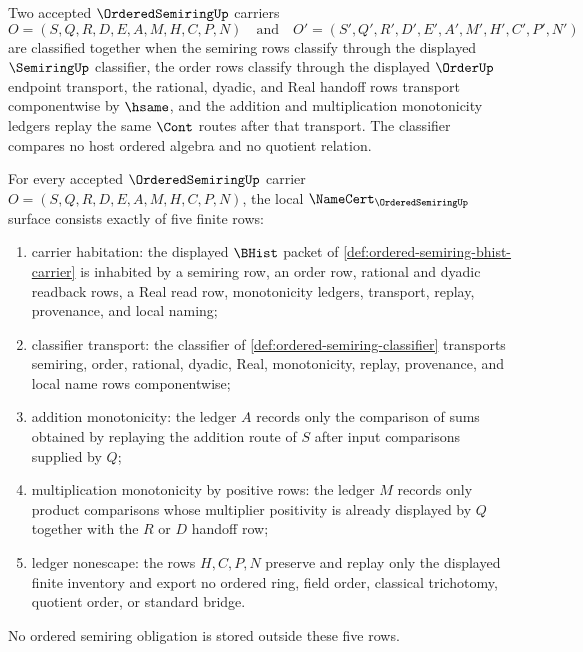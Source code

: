 \begin{definition}
\label{def:ordered-semiring-classifier}
Two accepted $\OrderedSemiringUp$ carriers
$$
O=(S,Q,R,D,E,A,M,H,C,P,N)
\quad\text{and}\quad
O'=(S',Q',R',D',E',A',M',H',C',P',N')
$$
are classified together when the semiring rows classify through the displayed $\SemiringUp$ classifier, the order rows classify through the displayed $\OrderUp$ endpoint transport, the rational, dyadic, and Real handoff rows transport componentwise by $\hsame$, and the addition and multiplication monotonicity ledgers replay the same $\Cont$ routes after that transport. The classifier compares no host ordered algebra and no quotient relation.
\end{definition}

\begin{theorem}
\label{thm:ordered-semiring-namecert-obligations}
For every accepted $\OrderedSemiringUp$ carrier $O=(S,Q,R,D,E,A,M,H,C,P,N)$, the local $\NameCert_{\OrderedSemiringUp}$ surface consists exactly of five finite rows:
\begin{enumerate}
\item carrier habitation: the displayed $\BHist$ packet of \autoref{def:ordered-semiring-bhist-carrier} is inhabited by a semiring row, an order row, rational and dyadic readback rows, a Real read row, monotonicity ledgers, transport, replay, provenance, and local naming;
\item classifier transport: the classifier of \autoref{def:ordered-semiring-classifier} transports semiring, order, rational, dyadic, Real, monotonicity, replay, provenance, and local name rows componentwise;
\item addition monotonicity: the ledger $A$ records only the comparison of sums obtained by replaying the addition route of $S$ after input comparisons supplied by $Q$;
\item multiplication monotonicity by positive rows: the ledger $M$ records only product comparisons whose multiplier positivity is already displayed by $Q$ together with the $R$ or $D$ handoff row;
\item ledger nonescape: the rows $H,C,P,N$ preserve and replay only the displayed finite inventory and export no ordered ring, field order, classical trichotomy, quotient order, or standard bridge.
\end{enumerate}
No ordered semiring obligation is stored outside these five rows.
\end{theorem}
